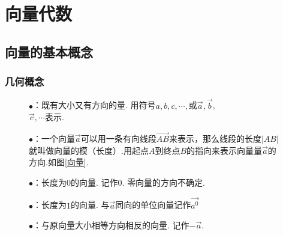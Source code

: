 \chapter{向量代数}
\section{向量的基本概念}
\subsection{几何概念}
\thispagestyle{empty}
\vspace*{-0.5cm}
\enupdefination[向量相关几何概念]
\begin{enumerate}[]
	\setlength{\itemindent}{3em}
	\setlength{\topsep}{0.01em}
	\setlength{\itemsep}{0.01em}
	\item \quad 
	\begin{figure}[h]
		\centering
		\begin{minipage}{0.8\linewidth}
			\item $\bullet$：既有大小又有方向的量. 用符号\boldmath$a,b,c,\cdots ,$\unboldmath 或$\overrightarrow{a},\overrightarrow b$,\\$\overrightarrow{c},\cdots $表示.
			\item $\bullet$：一个向量$\overrightarrow{a}$可以用一条有向线段$\overrightarrow{AB}$来表示，那么线段的长度$|AB|$就叫做向量的模（长度）.用起点$A$到终点$B$的指向来表示向量量$\overrightarrow{a}$的方向.如图\ref{向量}. 
			\item $\bullet$：长度为$0$的向量. 记作$0$. {\color{dy}零向量的方向不确定. }
			\item $\bullet$：长度为$1$的向量. 与$\overrightarrow{a}$同向的单位向量记作$\overrightarrow{a^0}$
			\item $\bullet$：与原向量大小相等方向相反的向量. 记作$-\overrightarrow{a}$.
		\end{minipage}%
		\hfill
		\begin{minipage}{0.2\linewidth}
			\centering

\end{minipage}
\end{figure}
\end{enumerate}
